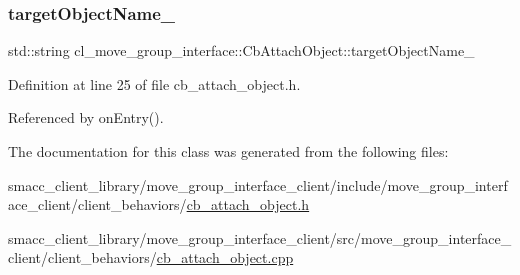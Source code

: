\subsubsection{\texorpdfstring{target\+Object\+Name\+\_\+}{targetObjectName\_}}
{\footnotesize\ttfamily std\+::string cl\+\_\+move\+\_\+group\+\_\+interface\+::\+Cb\+Attach\+Object\+::target\+Object\+Name\+\_\+}



Definition at line 25 of file cb\+\_\+attach\+\_\+object.\+h.



Referenced by on\+Entry().



The documentation for this class was generated from the following files\+:\begin{DoxyCompactItemize}
\item 
smacc\+\_\+client\+\_\+library/move\+\_\+group\+\_\+interface\+\_\+client/include/move\+\_\+group\+\_\+interface\+\_\+client/client\+\_\+behaviors/\hyperlink{cb__attach__object_8h}{cb\+\_\+attach\+\_\+object.\+h}\item 
smacc\+\_\+client\+\_\+library/move\+\_\+group\+\_\+interface\+\_\+client/src/move\+\_\+group\+\_\+interface\+\_\+client/client\+\_\+behaviors/\hyperlink{cb__attach__object_8cpp}{cb\+\_\+attach\+\_\+object.\+cpp}\end{DoxyCompactItemize}

